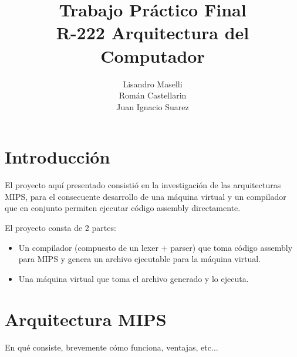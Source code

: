 \documentclass[12pt]{article}
\begin{document}
\title{
Trabajo Práctico Final \\
\large R-222 Arquitectura del Computador}
\author{ Lisandro Maselli\\
Román Castellarin\\
Juan Ignacio Suarez}
\maketitle
\section{Introducción}
El proyecto aquí presentado consistió en la investigación de las arquitecturas MIPS, para el consecuente desarrollo de una máquina virtual y un compilador que en conjunto permiten ejecutar código assembly directamente.

El proyecto consta de 2 partes:
\begin{itemize}
\item Un compilador (compuesto de un lexer + parser) que toma código assembly para MIPS y genera un archivo ejecutable para la máquina virtual.
\item Una máquina virtual que toma el archivo generado y lo ejecuta.
\end{itemize}    

\section{Arquitectura MIPS}
En qué consiste, brevemente cómo funciona, ventajas, etc...
\end{document}
